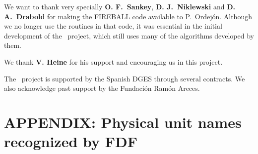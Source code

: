We want to thank very specially \textbf{O. F.\ Sankey}, \textbf{D. J.\
    Niklewski} and \textbf{D. A.\ Drabold} for making the FIREBALL
code available to P.\ Ordej\'on.  Although we no longer use the
routines in that code, it was essential in the initial development of
the \siesta\ project, which still uses many of the algorithms
developed by them.

We thank \textbf{V. Heine} for his support and encouraging us in this
project.

The \siesta\ project is supported by the Spanish DGES through
several contracts. We also acknowledge past support by the Fundaci\'on
Ram\'on Areces.



\section{APPENDIX: Physical unit names recognized by FDF}
\label{sec:fdf-units}

